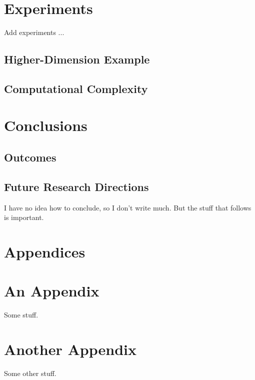\documentclass[11pt,twoside]{article}
\newtheorem{Corollary}{Corollary}
\newtheorem{Proposition}{Proposition}
\numberwithin{Theorem}{section}
\numberwithin{Definition}{section}
\numberwithin{Lemma}{section}
\numberwithin{Algorithm}{section}
\numberwithin{equation}{section}
\begin{document}





\section{Experiments}
Add experiments ...

\subsection{Higher-Dimension Example}

\subsection{Computational Complexity}
\clearpage

\section{Conclusions}

\subsection{Outcomes}

\subsection{Future Research Directions}
I have no idea how to conclude, so I don't write much. But the stuff that follows is important.
\clearpage


\clearpage

\appendix
\section*{Appendices}

\section{An Appendix}
\label{app:one}

Some stuff.
\clearpage

\section{Another Appendix}
\label{app:two}

Some other stuff.
\end{document}
